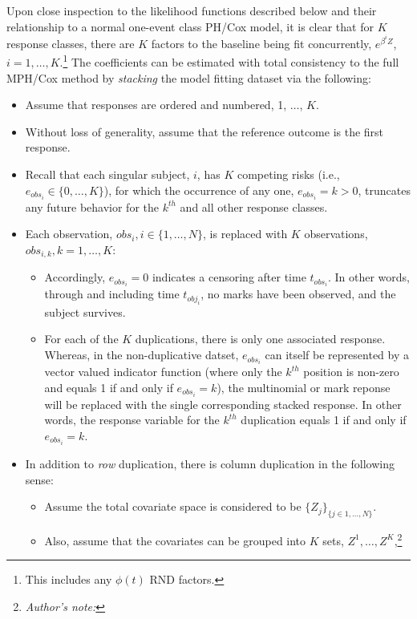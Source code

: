 \documentclass[10pt]{article}
\begin{document}
Upon close inspection to the likelihood functions described below and their relationship to a normal one-event class PH/Cox model,
it is clear that for $K$ response classes, there are $K$ factors to the baseline being fit concurrently, $e^{\beta^iZ}$, $i = 1, \ldots,
K$.\footnote{This includes any $\phi(t)$ RND factors.}  The coefficients can be estimated with total consistency to the full MPH/Cox method by {\em stacking} the
model fitting dataset via the following:
\begin{itemize}
    \item Assume that responses are ordered and numbered, 1, $\dots$, $K$.
    \item Without loss of generality, assume that the reference outcome is the first response.
    \item Recall that each singular subject, $i$, has $K$ competing risks (i.e., $e_{obs_i} \in \{0, \ldots, K\}$), 
                for which the occurrence of any one, $e_{obs_i}=k>0$, truncates
                any future behavior for the $k^{th}$ and all other response classes.  
    \item Each observation, $obs_i, i \in \{1, \ldots, N\}$, is replaced with $K$ observations, $obs_{i,k}, k=1, \ldots, K$:
        \begin{itemize}
            \item Accordingly, $e_{obs_i}=0$ indicates a censoring after time $t_{obs_i}$. In other words, through and including time 
                $t_{obj_i}$, no marks have been observed, and the subject survives.
            \item For each of the $K$ duplications, there is only one associated response. Whereas, in the non-duplicative
                datset, $e_{obs_i}$ can itself be represented by a vector valued indicator function (where only the $k^{th}$ position is non-zero and equals 1
                if and only if $e_{obs_i}=k$), the multinomial or mark reponse will be replaced with the 
                single corresponding stacked response.  In other words, the response variable for the $k^{th}$ duplication equals 1 if and only if $e_{obs_i}=k$.
        \end{itemize}
    \item In addition to {\em row} duplication, there is column duplication in the following sense:
        \begin{itemize}
            \item Assume the total covariate space is considered to be $\{Z_j\}_{\{j \in 1, \ldots, N\}}$.
            \item Also, assume that the covariates can be grouped into $K$ sets, $Z^1, \ldots, Z^K$,\footnote{{\em Author's note:} 
}
\end{itemize}
\end{itemize}
\end{document}
